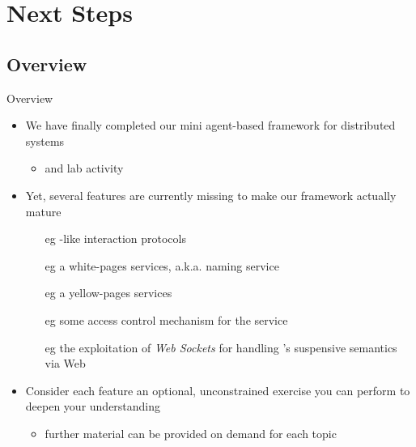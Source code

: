 \documentclass[presentation]{beamer}\mode<presentation>{\usetheme{AMSCesenaPurpleAndGold}}
\begin{document}
\section{Next Steps}

\subsection{Overview}

\begin{frame}{Overview}

	\begin{itemize}
		\item We have finally completed our mini agent-based framework for distributed systems
		\begin{itemize}
			\item and lab activity
		\end{itemize}

		\vfill

		\item Yet, several features are currently missing to make our framework actually mature
		\begin{itemize}
			\item[eg] \jade{}-like interaction protocols
			\item[eg] a white-pages services, a.k.a. naming service
			\item[eg] a yellow-pages services 
			\item[eg] some access control mechanism for the \linda{} service 
			\item[eg] the exploitation of \emph{Web Sockets} for handling \linda{}'s suspensive semantics via Web
		\end{itemize}

		\vfill

		\item Consider each feature an \alert{optional}, unconstrained exercise you can perform to deepen your understanding
		\begin{itemize}
			\item further material can be provided on demand for each topic
		\end{itemize}
	\end{itemize}

\end{frame}

\section*{}
\end{document}
